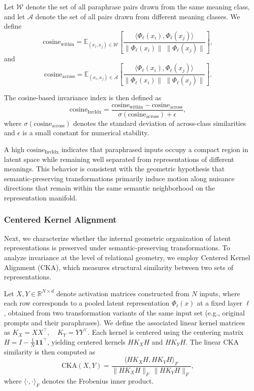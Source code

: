 Let $\mathcal{W}$ denote the set of all paraphrase pairs drawn from the same meaning class, and let $\mathcal{A}$ denote the set of all pairs drawn from different meaning classes. We define
\[
\text{cosine}_{\text{within}} = \mathbb{E}_{(x_i,x_j)\in \mathcal{W}}
\left[ 
\frac{\langle \Phi_\ell(x_i), \Phi_\ell(x_j)\rangle}
{\|\Phi_\ell(x_i)\|\;\|\Phi_\ell(x_j)\|}
\right],
\]
and
\[
\text{cosine}_{\text{across}} = \mathbb{E}_{(x_i,x_j)\in \mathcal{A}}
\left[ 
\frac{\langle \Phi_\ell(x_i), \Phi_\ell(x_j)\rangle}
{\|\Phi_\ell(x_i)\|\;\|\Phi_\ell(x_j)\|}
\right].
\]

The cosine-based invariance index is then defined as
\begin{equation}
\text{cosine}_{\text{InvIdx}} =
\frac{\text{cosine}_{\text{within}} - \text{cosine}_{\text{across}}}
{\sigma(\text{cosine}_{\text{across}}) + \epsilon},
\end{equation}
where $\sigma(\text{cosine}_{\text{across}})$ denotes the standard deviation of across-class similarities and $\epsilon$ is a small constant for numerical stability.

A high $\text{cosine}_{\text{InvIdx}}$ indicates that paraphrased inputs occupy a compact region in latent space while remaining well separated from representations of different meanings. This behavior is consistent with the geometric hypothesis that semantic-preserving transformations primarily induce motion along nuisance directions that remain within the same semantic neighborhood on the representation manifold.

\subsubsection{Centered Kernel Alignment}

Next, we characterize whether the internal geometric organization of latent representations is preserved under semantic-preserving transformations. 
To analyze invariance at the level of relational geometry, we employ Centered Kernel Alignment (CKA), which measures structural similarity between two sets of representations.

Let $X, Y \in \mathbb{R}^{N \times d}$ denote activation matrices constructed from $N$ inputs, where each row corresponds to a pooled latent representation $\Phi_\ell(x)$ at a fixed layer $\ell$, obtained from two transformation variants of the same input set (e.g., original prompts and their paraphrases). We define the associated linear kernel matrices as
\(
K_X = X X^\top, \quad K_Y = Y Y^\top.
\)
Each kernel is centered using the centering matrix $H = I - \frac{1}{N}\mathbf{1}\mathbf{1}^\top$, yielding centered kernels $HK_XH$ and $HK_YH$. The linear CKA similarity is then computed as
\begin{equation}
\text{CKA}(X, Y) =
\frac{\langle HK_XH, HK_YH \rangle_F}
{\|HK_XH\|_F \, \|HK_YH\|_F},
\end{equation}
where $\langle \cdot, \cdot \rangle_F$ denotes the Frobenius inner product.

